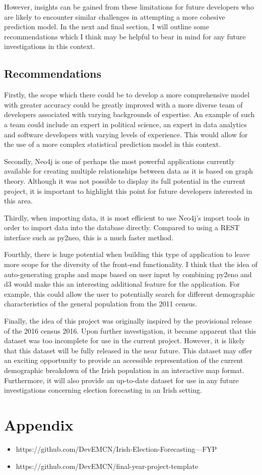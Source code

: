 However, insights can be gained from these limitations for future developers who are likely to encounter similar challenges in attempting a more cohesive prediction model. In the next and final section, I will outline some recommendations which I think may be helpful to bear in mind for any future investigations in this context.

\section{Recommendations}
Firstly, the scope which there could be to develop a more comprehensive model with greater accuracy could be greatly improved with a more diverse team of developers associated with varying backgrounds of expertise. An example of such a team could include an expert in political science, an expert in data analytics and software developers with varying levels of experience. This would allow for the use of a more complex statistical prediction model in this context.

Secondly, Neo4j is one of perhaps the most powerful applications currently available for creating multiple relationships between data as it is based on graph theory. Although it was not possible to display its full potential in the current project, it is important to highlight this point for future developers interested in this area. 

Thirdly, when importing data, it is most efficient to use Neo4j’s import tools in order to import data into the database directly. Compared to using a REST interface such as py2neo, this is a much faster method.

Fourthly, there is huge potential when building this type of application to leave more scope for the diversity of the front-end functionality. I think that the idea of auto-generating graphs and maps based on user input by combining py2eno and d3 would make this an interesting additional feature for the application. For example, this could allow the user to potentially search for different demographic characteristics of the general population from the 2011 census.

Finally, the idea of this project was originally inspired by the provisional release of the 2016 census 2016. Upon further investigation, it became apparent that this dataset was too incomplete for use in the current project. However, it is likely that this dataset will be fully released in the near future. This dataset may offer an exciting opportunity to provide an accessible representation of the current demographic breakdown of the Irish population in an interactive map format. Furthermore, it will also provide an up-to-date dataset for use in any future investigations concerning election forecasting in an Irish setting. 

\chapter{Appendix}
\begin{itemize}
	\item https://github.com/DevEMCN/Irish-Election-Forecasting---FYP
	
	\item https://github.com/DevEMCN/final-year-project-template
\end{itemize}
